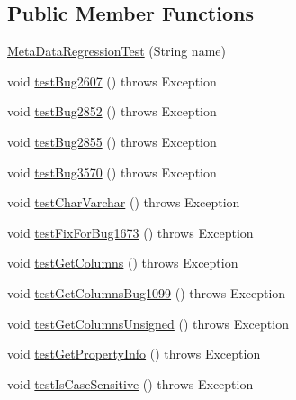 \subsection*{Public Member Functions}
\begin{DoxyCompactItemize}
\item 
\mbox{\hyperlink{classtestsuite_1_1regression_1_1_meta_data_regression_test_aaba5b0477f0c35256919f9c00a28c461}{Meta\+Data\+Regression\+Test}} (String name)
\item 
void \mbox{\hyperlink{classtestsuite_1_1regression_1_1_meta_data_regression_test_a2b9dcc0e397f42daa33e068203ec5277}{test\+Bug2607}} ()  throws Exception 
\item 
void \mbox{\hyperlink{classtestsuite_1_1regression_1_1_meta_data_regression_test_a37ae44d17afdb072e212dace2d333db9}{test\+Bug2852}} ()  throws Exception 
\item 
void \mbox{\hyperlink{classtestsuite_1_1regression_1_1_meta_data_regression_test_a7575c81c706f7b3eb33eafce244b371a}{test\+Bug2855}} ()  throws Exception 
\item 
void \mbox{\hyperlink{classtestsuite_1_1regression_1_1_meta_data_regression_test_a6b6d260139fb71288f93be76dac3f047}{test\+Bug3570}} ()  throws Exception 
\item 
void \mbox{\hyperlink{classtestsuite_1_1regression_1_1_meta_data_regression_test_a34109c03092379ea3c085035c26f8343}{test\+Char\+Varchar}} ()  throws Exception 
\item 
void \mbox{\hyperlink{classtestsuite_1_1regression_1_1_meta_data_regression_test_ab44999b95186ac7d583472c97d1fe24c}{test\+Fix\+For\+Bug1673}} ()  throws Exception 
\item 
void \mbox{\hyperlink{classtestsuite_1_1regression_1_1_meta_data_regression_test_a858c6ccbb86008517405f2e20ff56399}{test\+Get\+Columns}} ()  throws Exception 
\item 
void \mbox{\hyperlink{classtestsuite_1_1regression_1_1_meta_data_regression_test_af4ecb86f35850a0a32d35dd22a705df0}{test\+Get\+Columns\+Bug1099}} ()  throws Exception 
\item 
void \mbox{\hyperlink{classtestsuite_1_1regression_1_1_meta_data_regression_test_a04c1681aefa888950a3247f4495100c9}{test\+Get\+Columns\+Unsigned}} ()  throws Exception 
\item 
void \mbox{\hyperlink{classtestsuite_1_1regression_1_1_meta_data_regression_test_a19b374def5386df4eb8d89ef0c85375f}{test\+Get\+Property\+Info}} ()  throws Exception 
\item 
void \mbox{\hyperlink{classtestsuite_1_1regression_1_1_meta_data_regression_test_adb0e8b0fcde945a0ebdfbd318975979b}{test\+Is\+Case\+Sensitive}} ()  throws Exception 

\end{DoxyCompactItemize}
